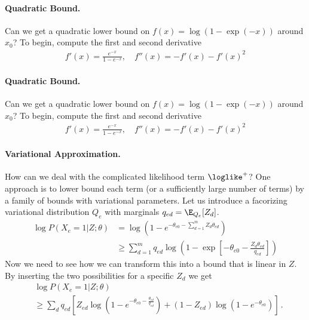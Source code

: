 \paragraph{Quadratic Bound.}

Can we get a quadratic lower bound on $f(x) = \log (1-\exp(-x))$ around $x_0$? To begin, compute the first and second derivative 
\begin{align}
f'(x) = \frac{e^{-x}}{1-e^{-x}}, \quad f''(x) = -f'(x) - f'(x)^2
\end{align}


\paragraph{Quadratic Bound.}

Can we get a quadratic lower bound on $f(x) = \log (1-\exp(-x))$ around $x_0$? To begin, compute the first and second derivative 
\begin{align}
f'(x) = \frac{e^{-x}}{1-e^{-x}}, \quad f''(x) = -f'(x) - f'(x)^2
\end{align}


\paragraph{Variational Approximation.} How can we deal with the complicated likelihood term $\loglike^+$? One approach is to lower bound each term (or a sufficiently large number of terms) by a family of bounds with variational parameters. Let us introduce a facorizing variational distribution $Q_e$ with marginals $q_{ed} = \E_{Q_e}[Z_d]$.
\begin{align}
\log P(X_e=1| Z; \theta) & = \log \left ( 1- e^{-\theta_{e0} - \sum_{d=1}^m Z_d \theta_{ed}} \right) \nonumber \\
& \ge \sum_{d=1}^m q_{ed} \log \left ( 1-\exp\left[ -\theta_{e0} - \frac{Z_d \theta_{ed}}{q_{ed}} \right] \right) 
\end{align}
Now we need to see how we can transform this into a bound that is linear in $Z$.  By inserting the two possibilities for a specific $Z_d$ we get 
\begin{align}
& \log P(X_e=1| Z; \theta) \nonumber \\
& \ge  \sum_d  q_{ed} \left[ 
Z_{ed} \log \left(1 - e^{-\theta_{e0} - \frac{\theta_{ed}}{q_{ed}}} \right)
+ (1-Z_{ed}) \log \left(1 - e^{-\theta_{e0}} \right)
\right]  \,.
\end{align}


